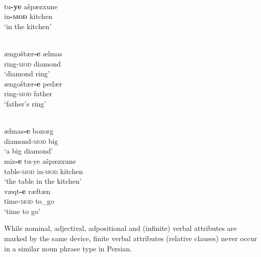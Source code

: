 \begin{exe}
\ex 
{}\label{multi persian}
\begin{xlist}
\\
\gll	tu\textbf{-ye} ašpæzxune\\
	in\textbf{-\textsc{mod}} kitchen\\
\glt ‘in the kitchen’
\begin{xlist}
\\
\gll 	ængoštær\textbf{-e} ælmas\\
	ring-\textsc{mod} diamond\\
\glt 	‘diamond ring’
\\
\gll	ængoštær\textbf{-e} pedær\\
	ring-\textsc{mod} father\\
\glt	‘father's ring’
\end{xlist}
\\
\gll	ælmas\textbf{-e} bozorg\\
	diamond-\textsc{mod} big\\
\glt	‘a big diamond’
\\
\gll	miz\textbf{-e} tu{-ye} ašpæzxune\\
	table-\textsc{mod} in{-\textsc{mod}} kitchen\\
\glt ‘the table in the kitchen’
\\
\gll	væqt\textbf{-e} ræftæn\\
	time-\textsc{mod} to\_go\\
\glt	‘time to go’
\end{xlist}
\end{exe}
While nominal, adjectival, adpositional and (infinite) verbal attributes are marked by the same device, finite verbal attributes (relative clauses) never occur in a similar noun phrase type in Persian.


